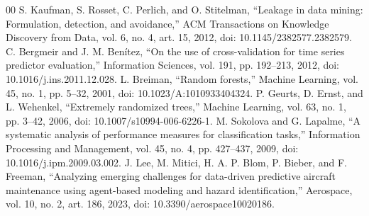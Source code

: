 \documentclass[conference]{IEEEtran}
\begin{document}
\begin{thebibliography}{00}
 S. Kaufman, S. Rosset, C. Perlich, and O. Stitelman, ``Leakage in data mining: Formulation, detection, and avoidance,'' ACM Transactions on Knowledge Discovery from Data, vol. 6, no. 4, art. 15, 2012, doi: 10.1145/2382577.2382579.
 C. Bergmeir and J. M. Ben\'itez, ``On the use of cross-validation for time series predictor evaluation,'' Information Sciences, vol. 191, pp. 192--213, 2012, doi: 10.1016/j.ins.2011.12.028.
 L. Breiman, ``Random forests,'' Machine Learning, vol. 45, no. 1, pp. 5--32, 2001, doi: 10.1023/A:1010933404324.
 P. Geurts, D. Ernst, and L. Wehenkel, ``Extremely randomized trees,'' Machine Learning, vol. 63, no. 1, pp. 3--42, 2006, doi: 10.1007/s10994-006-6226-1.
 M. Sokolova and G. Lapalme, ``A systematic analysis of performance measures for classification tasks,'' Information Processing and Management, vol. 45, no. 4, pp. 427--437, 2009, doi: 10.1016/j.ipm.2009.03.002.
 J. Lee, M. Mitici, H. A. P. Blom, P. Bieber, and F. Freeman, ``Analyzing emerging challenges for data-driven predictive aircraft maintenance using agent-based modeling and hazard identification,'' Aerospace, vol. 10, no. 2, art. 186, 2023, doi: 10.3390/aerospace10020186.
\end{thebibliography}
\end{document}
